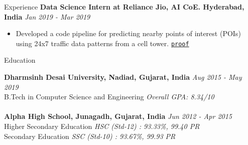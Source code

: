 \documentclass{resume}
\begin{document}
\begin{rSection}{Experience}
{\bf Data Science Intern at Reliance Jio, AI CoE. Hyderabad, India} \hfill {\em Jan 2019 - Mar 2019} 
\begin{itemize}
\item Developed a code pipeline for predicting nearby points of interest (POIs) using 24x7 traffic data patterns from a cell tower. \href{https://drive.google.com/file/d/15HGJEibw4-O9LstzlervOXbsh6GOyelO/view?usp=sharing}{\texttt{proof}}
\end{itemize}




\end{rSection}
\vspace{3pt} 

\begin{rSection}{Education}

{\bf Dharmsinh Desai University, Nadiad, Gujarat, India} \hfill {\em Aug 2015 - May 2019} 
\\ B.Tech in Computer Science and Engineering \hfill { \em Overall GPA: 8.34/10}\\
{\bf \\ Alpha High School, Junagadh, Gujarat, India} \hfill {\em Jun 2012 - Apr 2015} 
\\ Higher Secondary Education \hfill { \em HSC (Std-12) : 93.33\%, 99.40 PR}
\\ Secondary Education \hfill { \em SSC (Std-10) : 93.67\%, 99.93 PR}

\vspace{3pt} 

\end{rSection}
\end{document}
